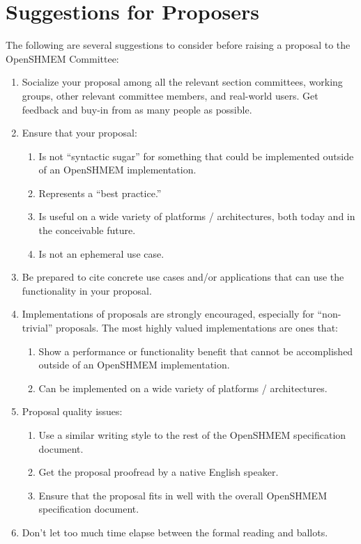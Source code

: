 \chapter{Suggestions for Proposers}

The following are several suggestions to consider before raising a
proposal to the OpenSHMEM Committee:

\begin{enumerate}
\item Socialize your proposal among all the relevant section
  committees, working groups, other relevant committee members, and real-world users.  Get
  feedback and buy-in from as many people as possible.

\item Ensure that your proposal:
  \begin{enumerate}
  \item Is not ``syntactic sugar'' for something that could be
    implemented outside of an OpenSHMEM implementation.
  \item Represents a ``best practice.''
  \item Is useful on a wide variety of platforms / architectures, both
    today and in the conceivable future.
  \item Is not an ephemeral use case.
  \end{enumerate}

\item Be prepared to cite concrete use cases and/or applications that
  can use the functionality in your proposal.

\item Implementations of proposals are strongly encouraged, especially
  for ``non-trivial'' proposals.  The most highly valued
  implementations are ones that:
  \begin{enumerate}
  \item Show a performance or functionality benefit that cannot be
    accomplished outside of an OpenSHMEM implementation.
  \item Can be implemented on a wide variety of platforms /
    architectures.
  \end{enumerate}

\item Proposal quality issues:
  \begin{enumerate}
  \item Use a similar writing style to the rest of the OpenSHMEM
    specification document.
  \item Get the proposal proofread by a native English speaker.
  \item Ensure that the proposal fits in well with the overall OpenSHMEM
    specification document.
  \end{enumerate}

\item Don't let too much time elapse between the formal reading and
  ballots.

\end{enumerate}
